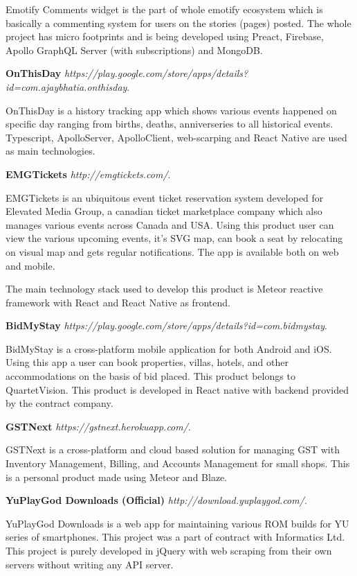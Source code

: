 \documentclass[margin,line]{res}
\begin{document}
\begin{resume}
Emotify Comments widget is the part of whole emotify ecosystem which is basically a commenting system for users on the stories (pages) posted. The whole project has micro footprints and is being developed using Preact, Firebase, Apollo GraphQL Server (with subscriptions) and MongoDB.

\textbf{OnThisDay} {\em https://play.google.com/store/apps/details?id=com.ajaybhatia.onthisday}. 

OnThisDay is a history tracking app which shows various events happened on specific day ranging from births, deaths, anniverseries to all historical events. Typescript, ApolloServer, ApolloClient, web-scarping and React Native are used as main technologies.  
 
\textbf{EMGTickets} {\em http://emgtickets.com/}. 

EMGTickets is an ubiquitous event ticket reservation system developed for Elevated Media Group, a canadian ticket marketplace company which also manages various events across Canada and USA. Using this product user can view the various upcoming events, it's SVG map, can book a seat by relocating on visual map and gets regular notifications. The app is available both on web and mobile. 

The main technology stack used to develop this product is Meteor reactive framework with React and React Native as frontend.

\textbf{BidMyStay} {\em https://play.google.com/store/apps/details?id=com.bidmystay}. 

BidMyStay is a cross-platform mobile application for both Android and iOS. Using this app a user can book properties, villas, hotels, and other accommodations on the basis of bid placed. This product belongs to QuartetVision. This product is developed in React native with backend provided by the contract company.

\textbf{GSTNext} {\em https://gstnext.herokuapp.com/}.

GSTNext is a cross-platform and cloud based solution for managing GST with Inventory Management, Billing, and Accounts Management for small shops. This is a personal product made using Meteor and Blaze.

\textbf{YuPlayGod Downloads (Official)} {\em http://download.yuplaygod.com/}. 

YuPlayGod Downloads is a web app for maintaining various ROM builds for YU series of smartphones. This project was a part of contract with Informatics Ltd. This project is purely developed in jQuery with web scraping from their own servers without writing any API server.


\end{resume}
\end{document}
